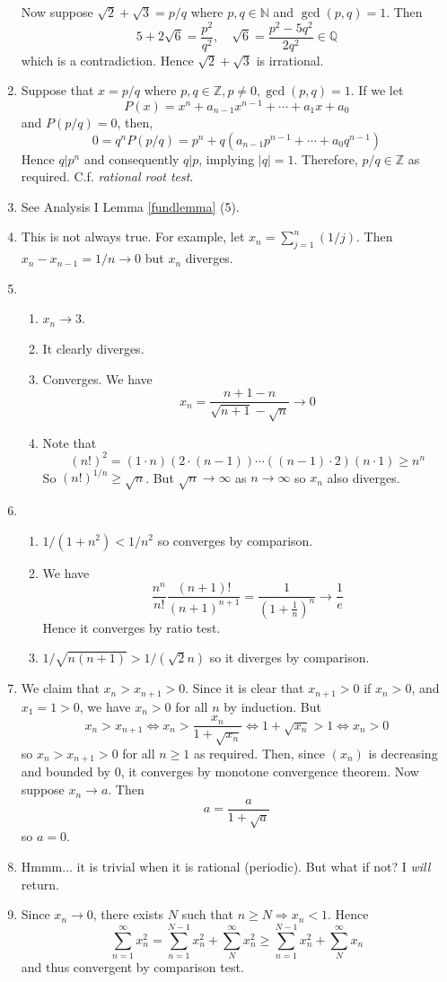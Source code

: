 \documentclass[10pt, a4paper, twoside]{report}
\begin{document}
\begin{enumerate}[{1.}]
    Now suppose \(\sqrt{2}+\sqrt{3}=p/q\) where \(p,q\in\mathbb{N}\) and \(\gcd(p,q)=1\). Then 
    \[5+2\sqrt{6}=\frac{p^2}{q^2},\quad\sqrt{6}=\frac{p^2-5q^2}{2q^2}\in\mathbb{Q}\]
    which is a contradiction. Hence \(\sqrt{2}+\sqrt{3}\) is irrational.
    \item Suppose that \(x=p/q\) where \(p,q\in\mathbb{Z},p\neq 0,\gcd(p,q)=1\). If we let 
    \[P(x)=x^n+a_{n-1}x^{n-1}+\cdots+a_1x+a_0\]
    and \(P(p/q)=0\), then,
    \[0=q^nP(p/q)=p^n+q(a_{n-1}p^{n-1}+\cdots+a_0q^{n-1})\]
    Hence \(q|p^n\) and consequently \(q|p\), implying \(|q|=1\). Therefore, \(p/q\in\mathbb{Z}\) as required. C.f. \emph{rational root test}.
    \item See Analysis I Lemma \ref{fundlemma} (5).
    \item This is not always true. For example, let \(x_n=\sum_{j=1}^n(1/j)\). Then \(x_n-x_{n-1}=1/n\to 0\) but \(x_n\) diverges.
    \item \begin{enumerate}[{(i)}]
        \item \(x_n\to 3\).
        \item It clearly diverges.
        \item Converges. We have 
        \[x_n=\frac{n+1-n}{\sqrt{n+1}-\sqrt{n}}\to 0\]
        \item Note that 
        \[(n!)^2=(1\cdot n)(2\cdot(n-1))\cdots((n-1)\cdot 2)(n\cdot 1)\geq n^n\]
        So \((n!)^{1/n}\geq\sqrt{n}\). But \(\sqrt{n}\to\infty\) as \(n\to\infty\) so \(x_n\) also diverges.
    \end{enumerate}
    \item \begin{enumerate}[{(i)}]
        \item \(1/(1+n^2)<1/n^2\) so converges by comparison.
        \item We have
        \[\frac{n^n}{n!}\frac{(n+1)!}{(n+1)^{n+1}}=\frac{1}{\left(1+\frac 1n\right)^n}\to\frac 1e\]
        Hence it converges by ratio test.
        \item \(1/\sqrt{n(n+1)}>1/(\sqrt{2}n)\) so it diverges by comparison.
    \end{enumerate}
    \item We claim that \(x_n>x_{n+1}>0\). Since it is clear that \(x_{n+1}>0\) if \(x_n>0\), and \(x_1=1>0\), we have \(x_n>0\) for all \(n\) by induction. But 
    \[x_n>x_{n+1}\Leftrightarrow x_n>\frac{x_n}{1+\sqrt{x_n}}\Leftrightarrow 1+\sqrt{x_n}>1\Leftrightarrow x_n>0\]
    so \(x_n>x_{n+1}>0\) for all \(n\geq 1\) as required. Then, since \((x_n)\) is decreasing and bounded by \(0\), it converges by monotone convergence theorem. Now suppose \(x_n\to a\). Then 
    \[a=\frac{a}{1+\sqrt{a}}\]
    so \(a=0\).
    \item Hmmm... it is trivial when it is rational (periodic). But what if not? I \emph{will} return.
    \item Since \(x_n\to 0\), there exists \(N\) such that \(n\geq N\Rightarrow x_n<1\). Hence 
    \[\sum_{n=1}^\infty x_n^2=\sum_{n=1}^{N-1}x_n^2+\sum_{N}^{\infty}x_n^2\geq\sum_{n=1}^{N-1}x_n^2+\sum_{N}^\infty x_n\]
    and thus convergent by comparison test.


\end{enumerate}
\end{document}
